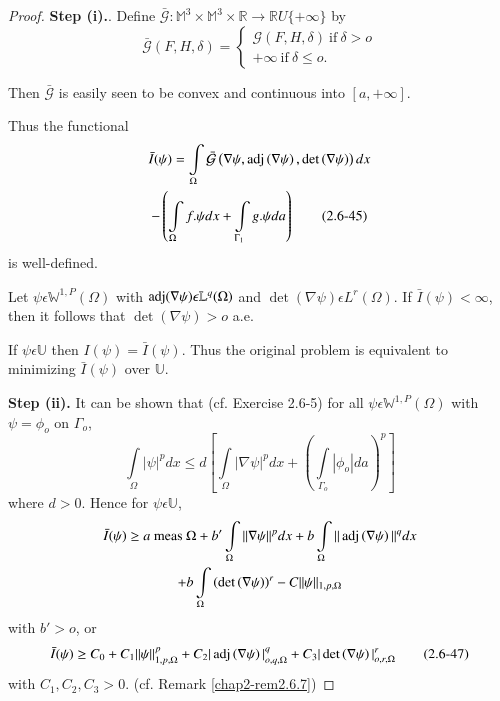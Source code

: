 \begin{proof}
  \textbf{Step (i).}. Define
  $\bar{\mathcal{G}}:\mathbb{M}^3 \times \mathbb{M}^3 \times \mathbb{R}\to \mathbb{R}U\{+ \infty\}$
  by  
  \begin{equation*}
    \bar{\mathcal{G}}(F,H,\delta)=
    \begin{cases}
      \mathcal{G}(F,H,\delta) ~\text{if}~ \delta > o\\
      +\infty ~\text{if}~ \delta \le o.
    \end{cases}
    \tag{2.6-44}\label{eq2.6-44}
  \end{equation*}

  Then $\bar{\mathcal{G}}$ is easily seen to be convex and continuous
  into $[a, +\infty]$. 

  Thus the functional  
  \begin{multline*}
    \bar{I}(\psi)  = \int\limits_\Omega
    \bar{\mathcal{G}}\left(\nabla \psi, \operatorname{adj}
    \left(\nabla \psi\right), 
    \det \left(\nabla \psi\right)\right)dx\\ 
    - \left(\int\limits_\Omega f. \psi dx + \int\limits_{\Gamma_1}g.\psi
    da\right) \tag{2.6-45}  \label{eq2.6-45}
  \end{multline*} 
  is well-defined.
  
  Let $\psi \epsilon \mathbb{W}^{1,P}(\Omega)$ with
  $\operatorname{adj}(\nabla \psi) \epsilon \mathbb{L}^q(\Omega)$ and
  $\det (\nabla \psi)\epsilon L^r(\Omega)$. 
  If $\bar{I}(\psi)< \infty$, then it follows that $\det
  (\nabla \psi)> o$ a.e. 
  
  If $\psi \epsilon \mathbb{U}$ then $I(\psi)=\bar{I}(\psi)$. Thus the
  original problem is equivalent to minimizing $\bar{I}(\psi)$ over
  $\mathbb{U}$. 
  
  \noindent \textbf{Step (ii).} It can be shown that (cf. Exercise
  2.6-5) for all $\psi 
  \epsilon \mathbb{W}^{1,P}(\Omega)$ with $\psi = \phi_o$ on
  $\Gamma_o$, 
  \begin{equation*}
    \int\limits_\Omega |\psi |^p dx \le d \left[\int\limits_\Omega
      |\nabla \psi |^p dx + \left(\int\limits_{\Gamma_o}| \phi_o |
      da\right)^p\right] \tag{2.6-46} \label{eq2.6-46}
  \end{equation*}
  where $d > 0$. Hence for $\psi \epsilon \mathbb{U}$,
  \begin{multline*}
    \bar{I}(\psi) \ge a ~\text{meas}~ \Omega  +b' \int\limits_\Omega
    ||\nabla \psi ||^p dx + b \int\limits_\Omega || \operatorname{adj}
    \left(\nabla \psi\right)||^q dx \\ 
    + b \int\limits_\Omega \left(\det \left(\nabla
    \psi\right)\right)^r -C|| \psi ||_{1,p,\Omega} 
  \end{multline*}
  with $b' > o$, or
  \begin{equation*}
    \bar{I}(\psi)\geq C_0+ C_1 \| \psi \| ^p_{1,p, \Omega}+ C_2 |\operatorname{adj}
    \left(\nabla \psi\right)|^q_{o,q, \Omega}+ C_3 |\det
    \left( \nabla \psi\right)|^r_{o,r, \Omega} \tag{2.6-47} \label{eq2.6-47}
  \end{equation*}\pageoriginale
  with $C_1, C_2, C_3>0$. (cf. Remark \ref{chap2-rem2.6.7})
  

\end{proof}

